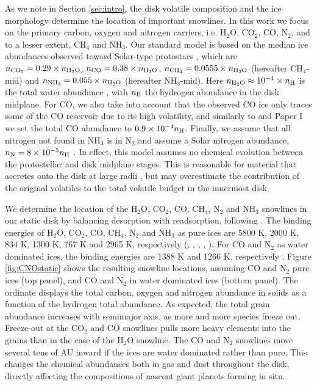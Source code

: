 \documentclass[apj]{emulateapj}
\begin{document}
As we note in Section \ref{sec:intro}, the disk volatile composition and the ice morphology determine the location of important snowlines. In this work we focus on the primary carbon, oxygen and nitrogen carriers, i.e. H$_2$O, CO$_2$, CO, N$_2$, and to a lesser extent, CH$_4$ and NH$_3$. %
Our standard model is based on the median ice abundances observed toward Solar-type protostars \citep{oberg11a}, which are $n_{\rm CO_2}=0.29 \times n_{\rm H_2O}$, $n_{\rm CO}=0.38 \times n_{\rm H_2O}$, $n_{\rm CH_4}=0.0555 \times n_{\rm H_2O}$ (hereafter CH$_4$-mid) and $n_{\rm NH_3}=0.055 \times n_{\rm H_2O}$ (hereafter NH$_3$-mid). Here $n_{\rm H_2O} \approx 10^{-4} \times n_{\rm H}$ is the total water abundance \citep{vandishoeck06}, with $n_{\rm H}$ the hydrogen abundance in the disk midplane. For CO, we also take into account that the observed CO ice only traces some of the CO reservoir due to its high volatility, and similarly to \citet{oberg11} and Paper I we set the total CO abundance to $0.9 \times 10^{-4} n_{\rm H}$. Finally, we assume that all nitrogen not found in NH$_3$ is in N$_2$ and assume a Solar nitrogen abundance, $n_{\rm N}=8 \times 10^{-5} n_{\rm H}$ \citep{lodders03}. In effect, this model assumes no chemical evolution between the protostellar and disk midplane stages. This is reasonable for material that accretes onto the disk at large radii \citep{visser09}, but may overestimate the contribution of the original volatiles to the total volatile budget in the innermost disk. 

We determine the location of the H$_2$O, CO$_2$, CO, CH$_4$, N$_2$ and NH$_3$ snowlines in our static disk by balancing desorption with readsorption, following \citet{hollenbach09}. The binding energies of H$_2$O, CO$_2$, CO, CH$_4$, N$_2$ and NH$_3$ as pure ices are 5800 K, 2000 K, 834 K, 1300 K, 767 K and 2965 K, respectively (\citealt{fraser01}, \citealt{collings04}, \citealt{fayolle16}, \citealt{garrod06}, \citealt{martin14}). For CO and N$_2$ as water dominated ices, the binding energies are 1388 K and 1266 K, respectively \citep{fayolle16}. Figure \ref{fig:CNOstatic} shows the resulting snowline locations, assuming CO and N$_2$ pure ices (top panel), and CO and N$_2$ in water dominated ices (bottom panel). The ordinate displays the total carbon, oxygen and nitrogen abundance in solids as a function of the hydrogen total abundance.  As expected, the total grain abundance increases with semimajor axis, as more and more species freeze out. Freeze-out at the CO$_2$ and CO snowlines pulls more heavy elements into the grains than in the case of the H$_2$O snowline.  The CO and N$_2$ snowlines move several tens of AU inward if the ices are water dominated rather than pure. This changes the chemical abundances both in gas and dust throughout the disk, directly affecting the compositions of nascent giant planets forming in situ.
\end{document}
